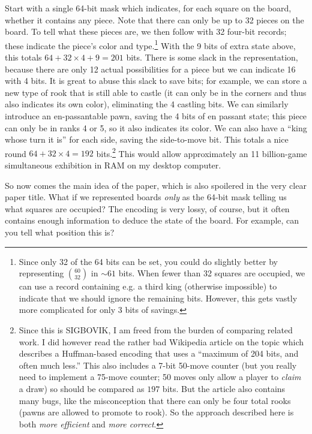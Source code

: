 \documentclass[twocolumn]{amsart}
\begin{document}
Start with a single 64-bit mask which indicates, for each square on
the board, whether it contains any piece. Note that there can only be
up to 32 pieces on the board. To tell what these pieces are, we then
follow with 32 four-bit records; these indicate the piece's color and
type.\footnote{Since only 32 of the 64 bits can be set, you could do
  slightly better by representing $\binom{60}{32}$ in $\sim 61$ bits.
  When fewer than 32 squares are occupied, we can use a record
  containing e.g. a third king (otherwise impossible) to indicate that
  we should ignore the remaining bits. However, this gets vastly more
  complicated for only 3 bits of savings.} 
%
With the 9 bits of extra state above, this totals $64+32 \times 4+9=201$
bits. There is some slack in the representation, because there are
only 12 actual possibilities for a piece but we can indicate 16 with 4
bits. It is great to abuse this slack to save bits; for example, we
can store a new type of rook that is still able to castle (it can only
be in the corners and thus also indicates its own color), eliminating
the 4 castling bits. We can similarly introduce an en-passantable
pawn, saving the 4 bits of en passant state; this piece can only be in
ranks 4 or 5, so it also indicates its color. We can also have a
``king whose turn it is'' for each side, saving the side-to-move bit.
This totals a nice round $64+32 \times 4=192$ bits.\footnote{ Since this is
  SIGBOVIK, I am freed from the burden of comparing related work. I
  did however read the rather bad Wikipedia article on the
  topic\cite{wikipediaboard} which describes a Huffman-based encoding
  that uses a ``maximum of 204 bits, and often much less.'' This also
  includes a 7-bit 50-move counter (but you really need to implement a
  75-move counter; 50 moves only allow a player to {\em claim} a draw)
  so should be compared as $197$ bits. But the article also contains
  many bugs, like the misconception that there can only be four total
  rooks (pawns are allowed to promote to rook). So the approach
  described here is both {\em more efficient} and {\em more correct}.}
%
This would allow approximately an 11 billion-game simultaneous
exhibition in RAM on my desktop computer.

\medskip
So now comes the main idea of the paper, which is also spoilered in the
very clear paper title. What if we represented boards {\em only} as the
64-bit mask telling us what squares are occupied? The encoding is very
lossy, of course, but it often contains enough information to deduce
the state of the board. For example, can you tell what position this is?
\end{document}
